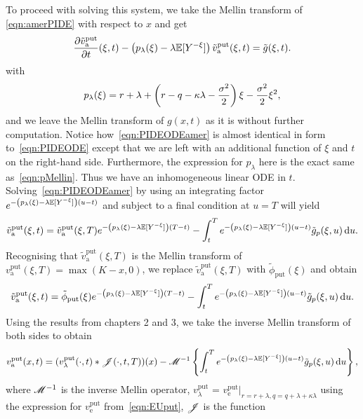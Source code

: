 To proceed with solving this system, we take the Mellin transform of \eqref{eqn:amerPIDE} with respect to $x$ and get
      \begin{equation}
      	  \label{eqn:PIDEODEamer}
        \frac{\partial \tilde{ v}_{\text{a}}^{\text{put}}}{\partial t}(\xi,t) - \left(p_\lambda(\xi) - \lambda\mathbb E[Y^{-\xi}]\right)\tilde{ v}_{\text{a}}^{\text{put}}(\xi,t) = \tilde{g}(\xi,t).
      \end{equation}
    with
      \begin{equation*}
        p_\lambda(\xi) = r + \lambda + \left(r - q -\kappa\lambda - \frac{\sigma^2}{2}\right)\xi - \frac{\sigma^2}{2}\xi^2,
      \end{equation*}
    and we leave the Mellin transform of $g(x,t)$ as it is without further computation. Notice how~\eqref{eqn:PIDEODEamer} is almost identical in form to~\eqref{eqn:PIDEODE} except that we are left with an additional function of $\xi$ and $t$ on the right-hand side. Furthermore, the expression for $p_\lambda$ here is the exact same as~\eqref{eqn:pMellin}. Thus we have an inhomogeneous linear ODE in $t$. Solving~\eqref{eqn:PIDEODEamer} by using an integrating factor $e^{-\left(p_\lambda(\xi) -\lambda\mathbb E[Y^{-\xi}]\right)(u-t)}$ and subject to a final condition at $u=T$ will yield
      $$
        \tilde{v}_{\text{a}}^{\text{put}}(\xi,t) = \tilde{ v}_{\text{a}}^{\text{put}}(\xi,T)e^{-\left(p_\lambda(\xi) -\lambda\mathbb E[Y^{-\xi}]\right)(T-t)} - \int_t^T e^{-\left(p_\lambda(\xi) -\lambda\mathbb E[Y^{-\xi}]\right)(u-t)}\tilde{g}_p(\xi,u) \, \mathrm d u.
      $$
      Recognising that $\tilde{ v}_{\text{a}}^{\text{put}}(\xi,T)$ is the Mellin transform of $v_{\text{a}}^{\text{put}}(\xi,T) = \max(K-x,0)$, we replace $\tilde{ v}_{\text{a}}^{\text{put}}(\xi,T)$ with $\tilde \phi_{\text{put}}(\xi)$ and obtain
       $$
        \tilde{ v}_{\text{a}}^{\text{put}}(\xi,t) = \tilde \phi_{\text{put}}(\xi)e^{-\left(p_\lambda(\xi) -\lambda\mathbb E[Y^{-\xi}]\right)(T-t)} - \int_t^T e^{-\left(p_\lambda(\xi) -\lambda\mathbb E[Y^{-\xi}]\right)(u-t)}\tilde{g}_p(\xi,u) \, \mathrm d u.
      $$
    Using the results from chapters 2 and 3, we take the inverse Mellin transform of both sides to obtain
      $$
       v_{\text{a}}^{\text{put}}(x,t) = (v_\lambda^{\text{put}}(\cdot,t) \ast \mathscr J(\cdot, t, T))(x)
        - \mathscr M^{-1}\left\{ \int_t^T e^{-\left(p_\lambda(\xi) -\lambda\mathbb E[Y^{-\xi}]\right)(u-t)}\tilde{g}_p(\xi,u) \, \mathrm d u \right\},
      $$
    where $\mathscr M^{-1}$ is the inverse Mellin operator, $v_\lambda^{\text{put}}$ = $v_\text{e}^{\text{put}}|_{r=r+\lambda,q=q+\lambda+\kappa\lambda}$ using the expression for $v_\text{e}^{\text{put}}$ from~\eqref{eqn:EUput}, $\mathscr J$ is the function
